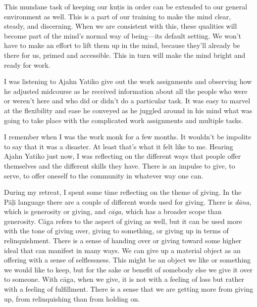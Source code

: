 This mundane task of keeping our kuṭis in order can be extended to 
our general environment as well. This is a part of our training to make 
the mind clear, steady, and discerning. When we are consistent with 
this, these qualities will become part of the mind's normal way of 
being---its default setting. We won't have to make an effort to lift 
them up in the mind, because they'll already be there for us, primed 
and accessible. This in turn will make the mind bright and ready for 
work.


I was listening to Ajahn Yatiko give out the work assignments and 
observing how he adjusted midcourse as he received information about 
all the people who were or weren't here and who did or didn't do a 
particular task. It was easy to marvel at the flexibility and ease he 
conveyed as he juggled around in his mind what was going to take place 
with the complicated work assignments and multiple tasks.

I remember when I was the work monk for a few months. It wouldn't be 
impolite to say that it was a disaster. At least that's what it felt 
like to me. Hearing Ajahn Yatiko just now, I was reflecting on the 
different ways that people offer themselves and the different skills 
they have. There is an impulse to give, to serve, to offer oneself to 
the community in whatever way one can.

During my retreat, I spent some time reflecting on the theme of giving. 
In the Pāḷi language there are a couple of different words used for 
giving. There is \emph{dāna}, which is generosity or giving, and 
\emph{cāga,} which has a broader scope than generosity. Cāga refers 
to the aspect of giving as well, but it can be used more with the tone 
of giving over, giving to something, or giving up in terms of 
relinquishment. There is a sense of handing over or giving toward some 
higher ideal that can manifest in many ways. We can give up a material 
object as an offering with a sense of selflessness. This might be an 
object we like or something we would like to keep, but for the sake or 
benefit of somebody else we give it over to someone. With cāga, when 
we give, it is not with a feeling of loss but rather with a feeling of 
fulfillment. There is a sense that we are getting more from giving up, 
from relinquishing than from holding on.


